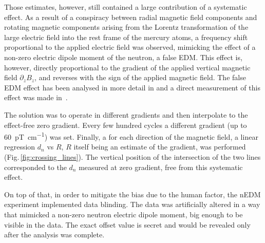 Those estimates, however, still contained a large contribution of a systematic effect. As a result of a conspiracy between radial magnetic field components and rotating magnetic components arising from the Lorentz transformation of the large electric field into the rest frame of the mercury atoms, a frequency shift proportional to the applied electric field was observed, mimicking the effect of a non-zero electric dipole moment of the neutron, a false EDM. This effect is, however, directly proportional to the gradient of the applied vertical magnetic field $\partial_z B_z$, and reverses with the sign of the applied magnetic field. The false EDM effect has been analysed in more detail in \cite{Pendlebury2004,PhysRevA.71.032104,PhysRevA.73.014101} and a direct measurement of this effect was made in~\cite{Afach2015falseEDM}.

The solution was to operate in different gradients and then interpolate to the effect-free zero gradient. Every few hundred cycles a different gradient (up to \SI{60}{\pico\tesla\per\centi\meter}) was set.
Finally, a for each direction of the magnetic field, a linear regression $d_n$ vs $R$, $R$ itself being an estimate of the gradient, was performed (Fig.\,\ref{fig:crossing_lines}). The vertical position of the intersection of the two lines corresponded to the $d_n$ measured at zero gradient, free from this systematic effect.


On top of that, in order to mitigate the bias due to the human factor, the nEDM experiment implemented data blinding. The data was artificially altered in a way that mimicked a non-zero neutron electric dipole moment, big enough to be visible in the data. The exact offset value is secret and would be revealed only after the analysis was complete.

